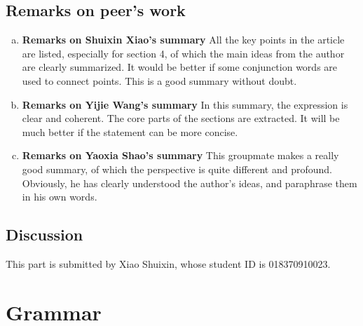 \documentclass[paper=a4, fontsize=11pt]{scrartcl} %
\numberwithin{equation}{section} %
\numberwithin{figure}{section} %
\numberwithin{table}{section} %
\begin{document}
	\subsection{Remarks on peer's work}
		\begin{enumerate}[(a)]
			\item \textbf{Remarks on Shuixin Xiao's summary}\newline
				All the key points in the article are listed, especially for section 4, of which the main ideas from the author are clearly summarized. It would be better if some conjunction words are used to connect points. This is a good summary without doubt. 
			\item \textbf{Remarks on Yijie Wang's summary}\newline
				In this summary, the expression is clear and coherent. The core parts of the sections are extracted. It will be much better if the statement can be more concise.
			\item \textbf{Remarks on Yaoxia Shao's summary}\newline
				This groupmate makes a really good summary, of which the perspective is quite different and profound. Obviously, he has clearly understood the author’s ideas, and paraphrase them in his own words. 
		\end{enumerate}
	
	\subsection{Discussion}
		This part is submitted by Xiao Shuixin, whose student ID is 018370910023.

\section{Grammar}
\end{document}
